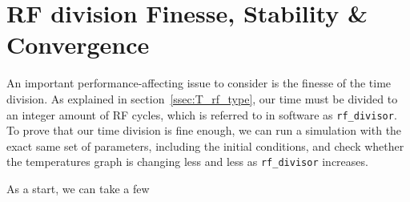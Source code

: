 \section{RF division Finesse, Stability \& Convergence}\label{sec:comp/convergence}

An important performance-affecting issue to consider is the finesse of the time division. As explained in section~\ref{ssec:T_rf_type}, our time must be divided to an integer amount of RF cycles, which is referred to in software as \texttt{rf\_divisor}. To prove that our time division is fine enough, we can run a simulation with the exact same set of parameters, including the initial conditions, and check whether the temperatures graph is changing less and less as \texttt{rf\_divisor} increases.

As a start, we can take a few


